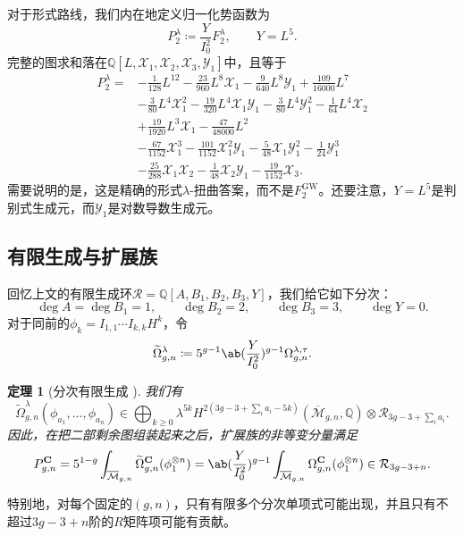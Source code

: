 \documentclass{amsart}
\newtheorem{thm}{定理}[section]
\theoremstyle{definition}
\theoremstyle{remark}
\theoremstyle{plain}
\theoremstyle{definition}
\theoremstyle{remark}
\newcommand{\Q}{\mathbb{Q}}
\newcommand{\Mbar}{\overline{\mathcal{M}}}
\newcommand{\mc}[1]{\mathcal{#1}}
\newcommand{\mbf}[1]{\mathbf{#1}}
\newcommand{\mr}[1]{\mathrm{#1}}
\newcommand{\wt}[1]{\widetilde{#1}}
\newcommand{\1}{\mathbf{1}}
\newcommand{\2}{\mathbf{2}}
\newcommand{\3}{\mathbf{3}}
\begin{document}
对于形式路线，我们内在地定义归一化势函数为
\[ P_2^{\lambda} \coloneqq \frac{Y}{I_0^2}F_2^{\lambda}, \qquad Y = L^5. \]
完整的图求和落在\(\Q[L,\mc{X}_1,\mc{X}_2,\mc{X}_3,\mc{Y}_1]\)中，且等于
\begin{align*}
    P_2^{\lambda} ={}& -\frac{1}{128}L^{12} - \frac{23}{960}L^8\mc{X}_1 - \frac{9}{640}L^8\mc{Y}_1 + \frac{109}{16000}L^7 \\
    &- \frac{3}{80}L^4\mc{X}_1^2 - \frac{19}{320}L^4\mc{X}_1\mc{Y}_1 - \frac{3}{80}L^4\mc{Y}_1^2 - \frac{1}{64}L^4\mc{X}_2 \\
    &+ \frac{19}{1920}L^3\mc{X}_1 - \frac{47}{48000}L^2 \\
    &- \frac{67}{1152}\mc{X}_1^3 - \frac{101}{1152}\mc{X}_1^2\mc{Y}_1 - \frac{5}{48}\mc{X}_1\mc{Y}_1^2 - \frac{1}{24}\mc{Y}_1^3 \\
    &- \frac{25}{288}\mc{X}_1\mc{X}_2 - \frac{1}{48}\mc{X}_2\mc{Y}_1 - \frac{19}{1152}\mc{X}_3.
\end{align*}
需要说明的是，这是精确的形式\(\lambda\)-扭曲答案，而不是\(F_2^{\mr{GW}}\)。还要注意，\(Y = L^5\)是判别式生成元，而\(\mc{Y}_1\)是对数导数生成元。

\subsection{有限生成与扩展族}%
\label{sub:Finite generation and the extended family}

回忆上文的有限生成环\(\mc{R} = \Q[A,B_1,B_2,B_3,Y]\)，我们给它如下分次：
\[ \deg A = \deg B_1 = 1, \qquad \deg B_2 = 2, \qquad \deg B_3 = 3, \qquad \deg Y = 0. \]
对于同前的\(\phi_k = I_{1,1}\cdots I_{k,k}H^k\)，令
\[ \wt{\Omega}^{\lambda}_{g,n} \coloneqq 5^{g-1}\ab(\frac{Y}{I_0^2})^{g-1}\Omega^{\lambda,\tau}_{g,n}. \]

\begin{thm}[分次有限生成 {\cite{GJRstructure}}]%
\label{thm:graded finite generation}
    我们有
    \[ \wt{\Omega}^{\lambda}_{g,n}(\phi_{a_1}, \ldots, \phi_{a_n}) \in \bigoplus_{k \geq 0}\lambda^{5k}H^{2(3g-3+\sum_i a_i - 5k)}(\Mbar_{g,n},\Q)\otimes \mc{R}_{3g-3+\sum_i a_i}. \]
    因此，在把二部剩余图组装起来之后，扩展族的非等变分量满足
    \[ P^{\mbf{C}}_{g,n} = 5^{1-g}\int_{\Mbar_{g,n}}\wt{\Omega}^{\mbf{C}}_{g,n}(\phi_1^{\otimes n}) = \ab( \frac{Y}{I_0^2})^{g-1}\int_{\Mbar_{g,n}}\Omega^{\mbf{C}}_{g,n}(\phi_1^{\otimes n}) \in \mc{R}_{3g-3+n}. \]
\end{thm}

特别地，对每个固定的\((g,n)\)，只有有限多个分次单项式可能出现，并且只有不超过\(3g-3+n\)阶的\(R\)矩阵项可能有贡献。
\end{document}
